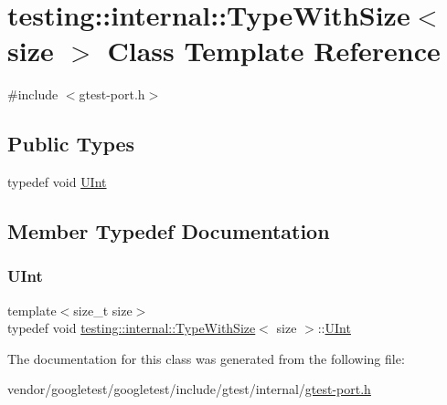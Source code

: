 \hypertarget{classtesting_1_1internal_1_1_type_with_size}{}\section{testing\+:\+:internal\+:\+:Type\+With\+Size$<$ size $>$ Class Template Reference}
\label{classtesting_1_1internal_1_1_type_with_size}


{\ttfamily \#include $<$gtest-\/port.\+h$>$}

\subsection*{Public Types}
\begin{DoxyCompactItemize}
\item 
typedef void \hyperlink{classtesting_1_1internal_1_1_type_with_size_a3898640d9f6c1e18110eef90f47a5d7b}{U\+Int}
\end{DoxyCompactItemize}


\subsection{Member Typedef Documentation}
\mbox{\label{classtesting_1_1internal_1_1_type_with_size_a3898640d9f6c1e18110eef90f47a5d7b}} 
\subsubsection{\texorpdfstring{U\+Int}{UInt}}
{\footnotesize\ttfamily template$<$size\+\_\+t size$>$ \\
typedef void \hyperlink{classtesting_1_1internal_1_1_type_with_size}{testing\+::internal\+::\+Type\+With\+Size}$<$ size $>$\+::\hyperlink{classtesting_1_1internal_1_1_type_with_size_a3898640d9f6c1e18110eef90f47a5d7b}{U\+Int}}



The documentation for this class was generated from the following file\+:\begin{DoxyCompactItemize}
\item 
vendor/googletest/googletest/include/gtest/internal/\hyperlink{gtest-port_8h}{gtest-\/port.\+h}\end{DoxyCompactItemize}
